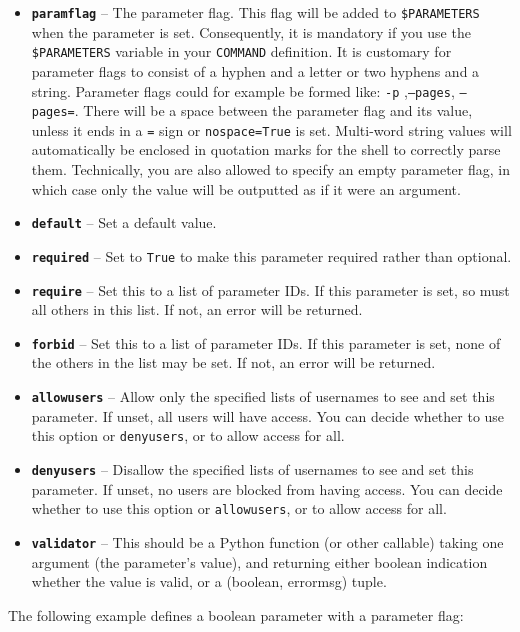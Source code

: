 \documentclass[a4paper,12pt,twoside,openright]{report}
\begin{document}
\begin{itemize}
\item \textbf{\texttt{paramflag}} -- The parameter flag. This flag will be
  added to \texttt{\$PARAMETERS} when the parameter is set. Consequently, it is
  mandatory if you use the \texttt{\$PARAMETERS} variable in your
  \texttt{COMMAND} definition. It is customary for parameter flags to consist
  of a hyphen and a letter or two hyphens and a string. Parameter flags could
  for example be formed like: \texttt{-p} ,\texttt{--pages},
  \texttt{--pages=}. There will be a space between the parameter flag and its
  value, unless it ends in a \texttt{=} sign or \texttt{nospace=True} is set.
  Multi-word string values will automatically be enclosed in quotation marks
  for the shell to correctly parse them. Technically, you are also allowed to
  specify an empty parameter flag, in which case only the value will be
  outputted as if it were an argument.
\item \textbf{\texttt{default}} -- Set a default value.
\item \textbf{\texttt{required}} -- Set to \texttt{True} to make this parameter required rather than optional.
\item \textbf{\texttt{require}} -- Set this to a list of parameter IDs. If this parameter is set, so must all others in this list. If not, an error will be returned.
\item \textbf{\texttt{forbid}} -- Set this to a list of parameter IDs. If this parameter is set, none of the others in the list may be set.  If not, an error will be returned.
\item \textbf{\texttt{allowusers}} -- Allow only the specified lists of usernames to see and set this parameter. If unset, all users will have access. You can decide whether to use this option or \texttt{denyusers}, or to allow access for all.
\item \textbf{\texttt{denyusers}} -- Disallow the specified lists of usernames to see and set this parameter. If unset, no users are blocked from having access. You can decide whether to use this option or \texttt{allowusers}, or to allow access for all.
\item \textbf{\texttt{validator}} -- This should be a Python function (or other callable) taking one argument (the parameter's value), and returning either boolean indication whether the value is valid, or a (boolean, errormsg) tuple.
\end{itemize}

The following example defines a boolean parameter with a parameter flag:
\end{document}
